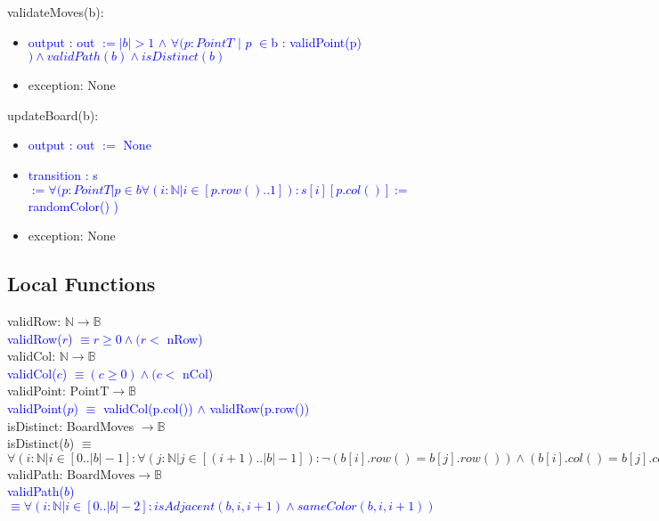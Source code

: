 \documentclass[12pt]{article}
\begin{document}
\noindent validateMoves(b): 
\begin{itemize}
\item \textcolor{blue}{output : out $:= |b| > 1$  $\land$  $\forall ( p : PointT$ $|$ $p$ $\in $b : validPoint(p)$) \land validPath(b) \land isDistinct(b)$}
\item exception: None
\end{itemize}

\noindent updateBoard(b): 
\begin{itemize}
\item \textcolor{blue}{output : out $ := $ None}
\item \textcolor{blue}{transition : s $ := \forall (p : PointT | p \in b  \forall(i : \mathbb{N} | i \in [p.row()..1]) : s[i][p.col()] := $ randomColor() ) }
\item exception: None
\end{itemize}

\subsection*{Local Functions}

\noindent validRow: $\mathbb{N} \rightarrow \mathbb{B}$\\
\noindent \textcolor{blue}{validRow($r$) $\equiv r \geq 0 \land (r < $ nRow)} \\

\noindent validCol: $\mathbb{N} \rightarrow \mathbb{B}$\\
\noindent \textcolor{blue}{validCol($c$) $\equiv (c \geq 0) \land (c < $ nCol)} \\


\noindent validPoint: $\mbox{PointT} \rightarrow \mathbb{B}$\\
\noindent \textcolor{blue}{validPoint($p$) $\equiv$ validCol(p.col()) $\land$ validRow(p.row())}\\

\noindent isDistinct: BoardMoves $\rightarrow \mathbb{B}$\\
\noindent isDistinct($b$) $\equiv$ $\forall(i : \mathbb{N}| i \in [0..|b|-1] : \forall (j : \mathbb{N} | j \in [(i+1)..|b|-1]) : \lnot (b[i].row() = b[j].row()) \land (b[i].col() = b[j].col()) )$  \\


\noindent validPath: $\mbox{BoardMoves} \rightarrow \mathbb{B}$\\
\noindent \textcolor{blue}{validPath($b$) $\equiv \forall(i : \mathbb{N} | i \in [0..|b|-2] : isAdjacent(b,i,i+1) \land sameColor(b,i,i+1)) $}\\
 
\end{document}
